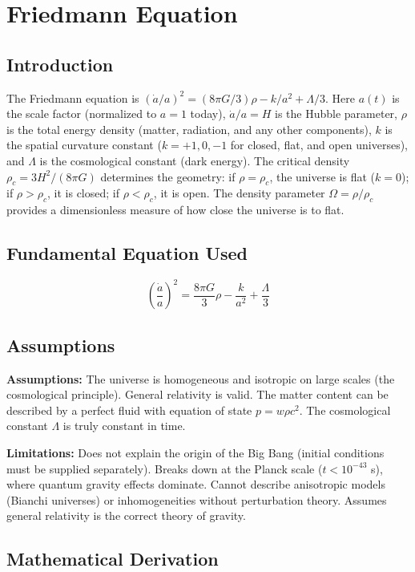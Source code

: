 \documentclass[11pt,openright]{book}
\begin{document}

\chapter{Friedmann Equation}

\section*{Introduction}

The Friedmann equation is $(\dot{a}/a)^2 = (8\pi G/3)\rho - k/a^2 + \Lambda/3$. Here $a(t)$ is the scale factor (normalized to $a = 1$ today), $\dot{a}/a = H$ is the Hubble parameter, $\rho$ is the total energy density (matter, radiation, and any other components), $k$ is the spatial curvature constant ($k = +1, 0, -1$ for closed, flat, and open universes), and $\Lambda$ is the cosmological constant (dark energy). The critical density $\rho_c = 3H^2/(8\pi G)$ determines the geometry: if $\rho = \rho_c$, the universe is flat ($k = 0$); if $\rho > \rho_c$, it is closed; if $\rho < \rho_c$, it is open. The density parameter $\Omega = \rho/\rho_c$ provides a dimensionless measure of how close the universe is to flat.
\section*{Fundamental Equation Used}

\[
\left(\frac{\dot{a}}{a}\right)^2 = \frac{8\pi G}{3}\rho - \frac{k}{a^2} + \frac{\Lambda}{3}
\]
\section*{Assumptions}

\textbf{Assumptions:} The universe is homogeneous and isotropic on large scales (the cosmological principle). General relativity is valid. The matter content can be described by a perfect fluid with equation of state $p = w\rho c^2$. The cosmological constant $\Lambda$ is truly constant in time.


\textbf{Limitations:} Does not explain the origin of the Big Bang (initial conditions must be supplied separately). Breaks down at the Planck scale ($t < 10^{-43}$ s), where quantum gravity effects dominate. Cannot describe anisotropic models (Bianchi universes) or inhomogeneities without perturbation theory. Assumes general relativity is the correct theory of gravity.


\section*{Mathematical Derivation}
\end{document}
